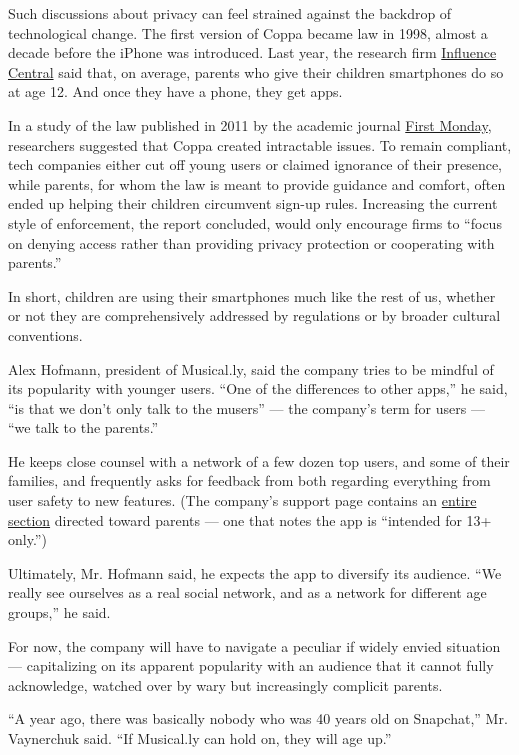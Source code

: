 Such discussions about privacy can feel strained against the backdrop of
technological change. The first version of Coppa became law in 1998,
almost a decade before the iPhone was introduced. Last year, the
research firm \href{http://influence-central.com/}{Influence Central}
said that, on average, parents who give their children smartphones do so
at age 12. And once they have a phone, they get apps.

In a study of the law published in 2011 by the academic journal
\href{http://journals.uic.edu/ojs/index.php/fm/article/view/3850/3075}{First
Monday}, researchers suggested that Coppa created intractable issues. To
remain compliant, tech companies either cut off young users or claimed
ignorance of their presence, while parents, for whom the law is meant to
provide guidance and comfort, often ended up helping their children
circumvent sign-up rules. Increasing the current style of enforcement,
the report concluded, would only encourage firms to ``focus on denying
access rather than providing privacy protection or cooperating with
parents.''

In short, children are using their smartphones much like the rest of us,
whether or not they are comprehensively addressed by regulations or by
broader cultural conventions.

Alex Hofmann, president of Musical.ly, said the company tries to be
mindful of its popularity with younger users. ``One of the differences
to other apps,'' he said, ``is that we don't only talk to the musers''
--- the company's term for users --- ``we talk to the parents.''

He keeps close counsel with a network of a few dozen top users, and some
of their families, and frequently asks for feedback from both regarding
everything from user safety to new features. (The company's support page
contains an \href{http://musicallyapp.tumblr.com/parents}{entire
section} directed toward parents --- one that notes the app is
``intended for 13+ only.'')

Ultimately, Mr. Hofmann said, he expects the app to diversify its
audience. ``We really see ourselves as a real social network, and as a
network for different age groups,'' he said.

For now, the company will have to navigate a peculiar if widely envied
situation --- capitalizing on its apparent popularity with an audience
that it cannot fully acknowledge, watched over by wary but increasingly
complicit parents.

``A year ago, there was basically nobody who was 40 years old on
Snapchat,'' Mr. Vaynerchuk said. ``If Musical.ly can hold on, they will
age up.''

